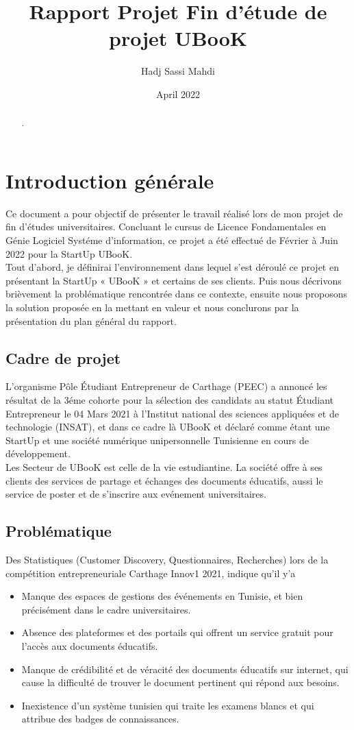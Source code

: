 \documentclass[12pt]{report}
\title{Rapport Projet Fin d'étude de projet UBooK}
\author{Hadj Sassi Mahdi}
\date{April 2022}
\begin{document}
\maketitle

\begin{abstract}
.
\end{abstract}


\tableofcontents



\chapter*{Introduction générale}



Ce document a pour objectif de présenter le travail réalisé lors de mon projet de fin d’études
universitaires. Concluant le cursus de Licence Fondamentales en Génie Logiciel Systéme d'information, ce projet a été effectué de Février à Juin 2022 pour la StartUp UBooK.\\
Tout d’abord, je définirai l’environnement dans lequel s’est déroulé ce projet en présentant la
StartUp « UBooK » et certains de ses clients. Puis nous décrivons brièvement la problématique rencontrée dans ce contexte, ensuite nous proposons la solution proposée en la mettant en
valeur et nous conclurons par la présentation du plan général du rapport.
\section*{Cadre de projet}
L'organisme Pôle Étudiant Entrepreneur de Carthage (PEEC) a annoncé les résultat de la 3éme cohorte pour la sélection des candidats au statut Étudiant Entrepreneur le 04 Mars 2021 à l'Institut national des sciences appliquées et de technologie (INSAT), et dans ce cadre là UBooK et déclaré comme étant une StartUp et une société numérique unipersonnelle Tunisienne en cours de développement.
\\Les Secteur de UBooK est celle de la vie estudiantine. La société offre à ses clients des services de partage et échanges des documents éducatifs, aussi le service de poster et de s'inscrire aux evénement universitaires.
\section*{Problématique}
Des Statistiques (Customer Discovery, Questionnaires, Recherches) lors de la compétition entrepreneuriale Carthage Innov1 2021, indique qu'il y'a 
\begin{itemize}
\item 
Manque des espaces de gestions des événements en Tunisie, et bien précisément dans le cadre universitaires.
\item Absence des plateformes et des portails qui offrent un service gratuit pour l'accès aux documents éducatifs.
\item Manque de crédibilité et de véracité des documents éducatifs sur internet, qui cause la difficulté de trouver le document pertinent qui répond aux besoins. 
\item Inexistence d'un système tunisien qui traite les examens blancs et qui attribue des badges de connaissances.
\end{itemize}
\end{document}
